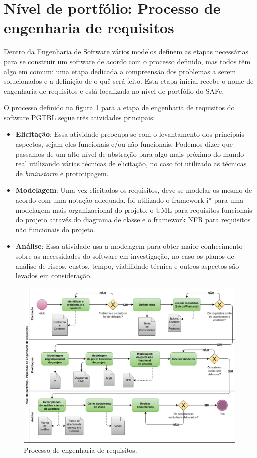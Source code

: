 \section{Nível de portfólio: Processo de engenharia de requisitos}

Dentro da Engenharia de Software vários modelos definem as etapas necessárias para se construir um software de acordo com o processo definido, mas todos têm algo em comum: uma etapa dedicada a compreensão dos problemas a serem solucionados e a definição de o quê será feito. Esta etapa inicial recebe o nome de engenharia de requisitos e está localizado no nível de portfólio do SAFe.

O processo definido na figura \ref{fig:requisitos} para a etapa de engenharia de requisitos do software PGTBL segue três atividades principais:

\begin{itemize}
  \item \textbf{Elicitação}: Essa atividade preocupa-se com o levantamento dos principais aspectos, sejam eles funcionais e/ou não funcionais. Podemos dizer que passamos de um alto nível de abstração para algo mais próximo do mundo real utilizando várias técnicas de elicitação, no caso foi utilizado as técnicas de \textit{brainstorm} e prototipagem.
  \item \textbf{Modelagem}: Uma vez elicitados os requisitos, deve-se modelar os mesmo de acordo com uma notação adequada, foi utilizado o framework i* para uma modelagem mais organizacional do projeto, o UML para requisitos funcionais do projeto através do diagrama de classe e o framework NFR para requisitos não funcionais do projeto.
  \item \textbf{Análise}: Essa atividade usa a modelagem para obter maior conhecimento sobre as necessidades do software em investigação, no caso os planos de análise de riscos, custos, tempo, viabilidade técnica e outros aspectos são levados em
consideração.
\end{itemize}

\begin{figure}[h!]
	\centering
  \includegraphics[keepaspectratio=true,scale=0.5]{figuras/requisitos.eps}
  \caption{Processo de engenharia de requisitos.}
	\label{fig:requisitos}
\end{figure}

